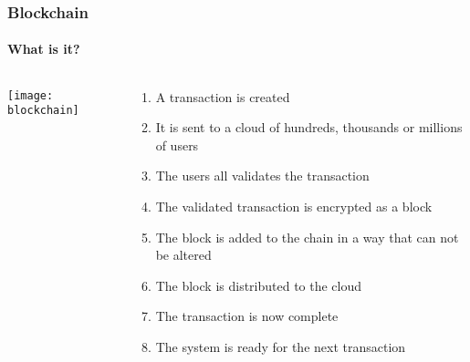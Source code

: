 \begin{frame}
  \frametitle{Blockchain}
  \framesubtitle{What is it?}

\begin{columns}
\begin{column}{0.5\textwidth}
  \begin{center}
   \texttt{[image: blockchain]}
   \end{center}
\end{column}
\begin{column}{0.5\textwidth}  %

          \begin{enumerate}
\scriptsize
            \item A transaction is created
            \item It is sent to a cloud of hundreds, thousands or millions of users
            \item The users all validates the transaction
            \item The validated transaction is encrypted as a block
            \item The block is added to the chain in a way that can not be altered
            \item The block is distributed to the cloud
            \item The transaction is now complete
            \item The system is ready for the next transaction
                 \end{enumerate}
\end{column}
\end{columns}

\end{frame}
